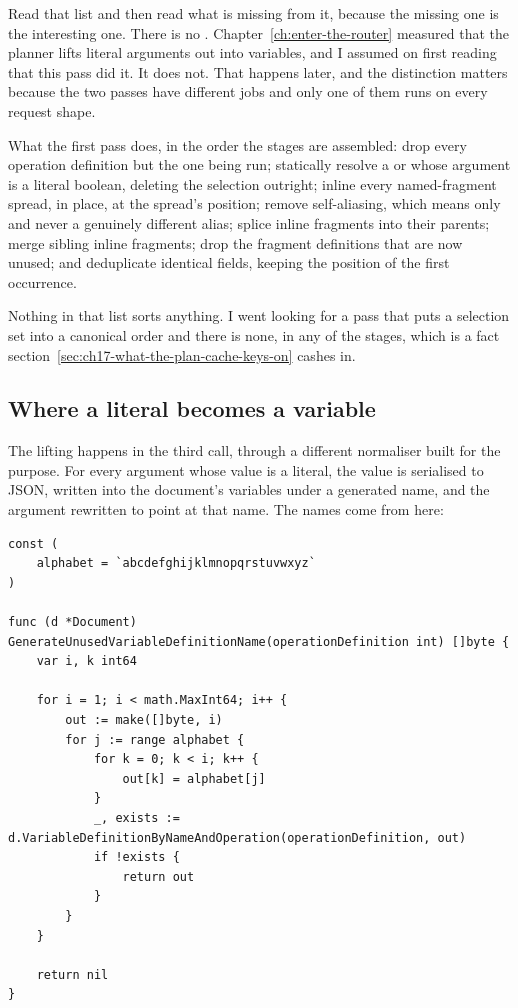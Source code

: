 Read that list and then read what is missing from it, because the missing one is
the interesting one. There is no .
Chapter~\ref{ch:enter-the-router} measured that the planner lifts literal
arguments out into variables, and I assumed on first reading that this pass did
it. It does not. That happens later, and the distinction matters because the two passes
have different jobs and only one of them runs on every request shape.

What the first pass does, in the order the stages are assembled: drop every
operation definition but the one being run; statically resolve a
 or  whose argument is a literal boolean, deleting
the selection outright; inline every named-fragment spread, in place, at the
spread's position; remove self-aliasing, which means only  and
never a genuinely different alias; splice inline fragments into their parents;
merge sibling inline fragments; drop the fragment definitions that are now
unused; and deduplicate identical fields, keeping the position of the first
occurrence.

%
Nothing in that list sorts anything. I went looking for a pass that puts a
selection set into a canonical order and there is none, in any of the stages,
which is a fact section~\ref{sec:ch17-what-the-plan-cache-keys-on} cashes in.

\subsection*{Where a literal becomes a variable}

%
The lifting happens in the third call, through a different normaliser built for
the purpose. For every argument whose value is a literal, the value is
serialised to JSON, written into the document's variables under a generated
name, and the argument rewritten to point at that name. The names come from
here:

\begin{verbatim}
const (
	alphabet = `abcdefghijklmnopqrstuvwxyz`
)

func (d *Document) GenerateUnusedVariableDefinitionName(operationDefinition int) []byte {
	var i, k int64

	for i = 1; i < math.MaxInt64; i++ {
		out := make([]byte, i)
		for j := range alphabet {
			for k = 0; k < i; k++ {
				out[k] = alphabet[j]
			}
			_, exists := d.VariableDefinitionByNameAndOperation(operationDefinition, out)
			if !exists {
				return out
			}
		}
	}

	return nil
}
\end{verbatim}

